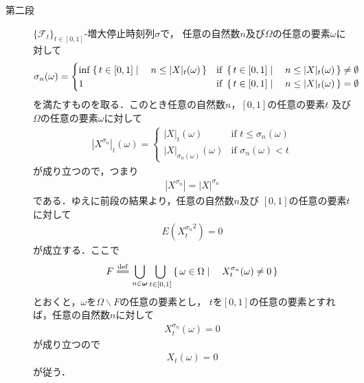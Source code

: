 \begin{sketch}
\begin{description}
			\item[第二段] $\{\mathscr{F}_{t}\}_{t \in [0,1]}$-増大停止時刻列$\sigma$で，
				任意の自然数$n$及び$\Omega$の任意の要素$\omega$に対して
				\begin{align}
					\sigma_{n}(\omega) = 
					\begin{cases}
						\operatorname*{inf}_{} \left\{\, t \in [0,1] \mid \quad n \leq |X|_{t}(\omega)\, \right\} 
						& \mbox{if } \left\{\, t \in [0,1] \mid \quad n \leq |X|_{t}(\omega)\, \right\} \neq \emptyset \\
						1 & \mbox{if } \left\{\, t \in [0,1] \mid \quad n \leq |X|_{t}(\omega)\, \right\} = \emptyset
					\end{cases}
				\end{align}
				を満たすものを取る．このとき任意の自然数$n$，$[0,1]$の任意の要素$t$
				及び$\Omega$の任意の要素$\omega$に対して
				\begin{align}
					\left|X^{\sigma_{n}}\right|_{t}(\omega) = 
					\begin{cases}
						\left|X\right|_{t}(\omega) &\mbox{if } t \leq \sigma_{n}(\omega) \\
						\left|X\right|_{\sigma_{n}(\omega)}(\omega) &\mbox{if } \sigma_{n}(\omega) < t
					\end{cases}
				\end{align}
				が成り立つので，つまり
				\begin{align}
					\left|X^{\sigma_{n}}\right| = |X|^{\sigma_{n}}
				\end{align}
				である．ゆえに前段の結果より，任意の自然数$n$及び
				$[0,1]$の任意の要素$t$に対して
				\begin{align}
					E\left({X^{\sigma_{n}}_{t}}^{2}\right) = 0
				\end{align}
				が成立する．ここで
				\begin{align}
					F \defeq \bigcup_{n \in \Natural} \bigcup_{t \in [0,1]}
					\Set{\omega \in \Omega}{X^{\sigma_{n}}_{t}(\omega) \neq 0}
				\end{align}
				とおくと，$\omega$を$\Omega \backslash F$の任意の要素とし，
				$t$を$[0,1]$の任意の要素とすれば，任意の自然数$n$に対して
				\begin{align}
					X^{\sigma_{n}}_{t}(\omega) = 0
				\end{align}
				が成り立つので
				\begin{align}
					X_{t}(\omega) = 0
				\end{align}
				が従う．
				\QED
		\end{description}
	\end{sketch}
	
	\begin{screen}
	\end{screen}
	
